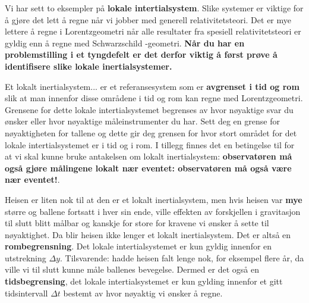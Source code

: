 \documentclass{beamer}
\renewcommand{\ss}{Schwarz\-schild }
\newcommand{\pagebutton}[1]{\setbeamertemplate{button}{\tikz\node[inner xsep = 5pt, draw = structure!90, fill = green(ryb), rounded corners = 8pt]{\color{amber}\Large\insertbuttontext};}\beamerbutton{#1}}
\begin{document}
\begin{frame}
{
Vi har sett to eksempler på {\bf lokale intertialsystem}. Slike systemer er viktige for å gjøre det lett å regne når vi jobber med generell relativitetsteori. Det er mye lettere å regne i Lorentzgeometri når alle resultater fra spesiell relativitetsteori er gyldig enn å regne med \ss-geometri. {\bf Når du har en problemstilling i et tyngdefelt er det derfor viktig å først prøve å identifisere slike lokale inertialsystemer.}
\hyperlink{inert14}{\pagebutton{SIDE 36/39/73}}}

{
\begin{block}{Et lokalt inertialsystem...}
er et referansesystem som er {\bf avgrenset i tid og rom} slik at man innenfor disse områdene i tid og rom kan regne med Lorentzgeometri. Grensene for dette lokale intertialsystemet begrenses av hvor nøyaktige svar du ønsker eller hvor nøyaktige måleinstrumenter du har. Sett deg en grense for nøyaktigheten for tallene og dette gir deg grensen for hvor stort området for det lokale intertialsystemet er i tid og i rom. I tillegg finnes det en betingelse til for at vi skal kunne bruke antakelsen om lokalt inertialsystem: {\bf observatøren må også gjøre målingene lokalt nær eventet: observatøren må også være nær eventet!}.
\end{block}
Heisen er liten nok til at den er et lokalt inertialsystem, men hvis heisen var {\bf mye} større og ballene fortsatt i hver sin ende, ville effekten av forskjellen i gravitasjon til slutt blitt målbar og kanskje for store for kravene vi ønsker å sette til nøyaktighet. Da blir heisen ikke lenger et lokalt inertialsystem. Det er altså en {\bf rombegrensning}. Det lokale intertialsystemet er kun gyldig innenfor en utstrekning $\Delta y$. Tilsvarende: hadde heisen falt lenge nok, for eksempel flere år, da ville vi til slutt kunne måle ballenes bevegelse. Dermed er det også en {\bf tidsbegrensing}, det lokale intertialsystemet er kun gylding innenfor et gitt tidsintervall $\Delta t$ bestemt av hvor nøyaktig vi ønsker å regne.
\hyperlink{inert15}{\pagebutton{SIDE 37/39/73}}}



\end{frame}
\end{document}
